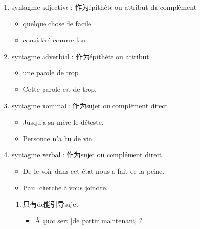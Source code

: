 \documentclass[UTF8]{report}
\begin{document}
\begin{enumerate}
    \item syntagme adjective : 作为épithète ou attribut du complément
    \begin{itemize}
        \item quelque chose de facile
        \item considéré comme fou
    \end{itemize}
    \item syntagme adverbial : 作为épithète ou attribut
    \begin{itemize}
        \item une parole de trop
        \item Cette parole est de trop.
    \end{itemize}
    \item syntagme nominal : 作为sujet ou complément direct
    \begin{itemize}
        \item Jusqu’à sa mère le déteste.
        \item Personne n’a bu de vin.
    \end{itemize}
    \item syntagme verbal : 作为sujet ou complément direct
    \begin{itemize}
        \item De le voir dans cet état nous a fait de la peine.
        \item Paul cherche à vous joindre.
    \end{itemize}
    \begin{enumerate}
        \item 只有de能引导sujet
        \begin{itemize}
            \item À quoi sert [de partir maintenant] ?
        \end{itemize}
    \end{enumerate}
\end{enumerate}
\end{document}
